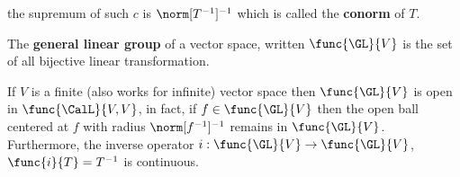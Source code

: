 \begin{remark}
    the supremum of such \(c\) is \(\norm[T^{-1}]^{-1}\) which is called the \textbf{conorm} of \(T\).
\end{remark}

\begin{definition}
    The \textbf{general linear group} of a vector space, written \(\func{\GL}{V}\) is the set of all bijective linear transformation.
\end{definition}

\begin{proposition}
    If \(V\) is a finite (also works for infinite) vector space then \(\func{\GL}{V}\) is open in \(\func{\CalL}{V,V}\), in fact, if \(f \in \func{\GL}{V}\) then the open ball centered at \(f\) with radius \(\norm[f^{-1}]^{-1}\) remains in \(\func{\GL}{V}\). Furthermore, the inverse operator \(i : \func{\GL}{V} \to \func{\GL}{V}\), \(\func{i}{T} = T^{-1}\) is continuous.
\end{proposition}

